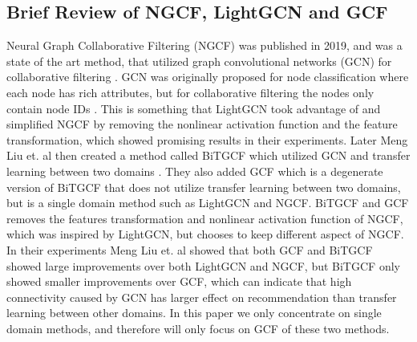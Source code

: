 \subsection{Brief Review of NGCF, LightGCN and GCF}\label{subsubsec:brief-review}
Neural Graph Collaborative Filtering (NGCF) was published in 2019, and was a state of the art method, that utilized graph convolutional networks (GCN) for collaborative filtering \cite{NGCF_2019}.
GCN was originally proposed for node classification where each node has rich attributes, but for collaborative filtering the nodes only contain node IDs \cite{lightgcn,kipf2017semisupervised,NGCF_2019}.
This is something that LightGCN took advantage of and simplified NGCF by removing the nonlinear activation function and the feature transformation, which showed promising results in their experiments.
Later Meng Liu et. al then created a method called BiTGCF which utilized GCN and transfer learning between two domains \cite{BiTGCF}.
They also added GCF which is a degenerate version of BiTGCF that does not utilize transfer learning between two domains, but is a single domain method such as LightGCN and NGCF.
BiTGCF and GCF removes the features transformation and nonlinear activation function of NGCF, which was inspired by LightGCN, but chooses to keep different aspect of NGCF.
In their experiments Meng Liu et. al showed that both GCF and BiTGCF showed large improvements over both LightGCN and NGCF, but BiTGCF only showed smaller improvements over GCF, which can indicate that high connectivity caused by GCN has larger effect on recommendation than transfer learning between other domains.
In this paper we only concentrate on single domain methods, and therefore will only focus on GCF of these two methods.

